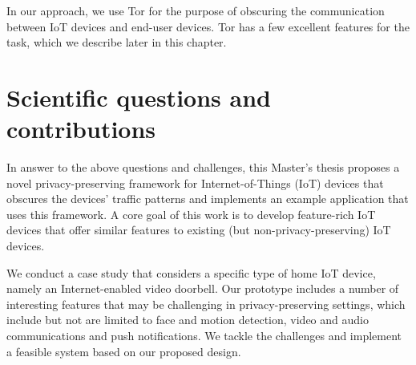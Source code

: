 In our approach, we use Tor \cite{torproject} for the purpose of obscuring the communication between IoT devices and end-user devices. Tor has a few excellent features for the task, which we describe later in this chapter.

\section{Scientific questions and contributions}

In answer to the above questions and challenges, this Master's thesis proposes a novel privacy-preserving framework for Internet-of-Things (IoT) devices that obscures the devices' traffic patterns and implements an example application that uses this framework. A core goal of this work is to develop feature-rich IoT devices that offer similar features to existing (but non-privacy-preserving) IoT devices.

We conduct a case study that considers a specific type of home IoT device, namely an Internet-enabled video doorbell. Our prototype includes a number of interesting features that may be challenging in privacy-preserving settings, which include but not are limited to face and motion detection, video and audio communications and push notifications. We tackle the challenges and implement a feasible system based on our proposed design.



